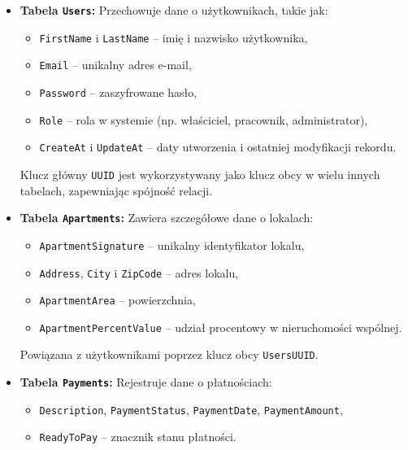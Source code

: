 \begin{itemize}
    \item \textbf{Tabela \texttt{Users}:}
    Przechowuje dane o użytkownikach, takie jak:
    \begin{itemize}
        \item \texttt{FirstName} i \texttt{LastName} -- imię i nazwisko użytkownika,
        \item \texttt{Email} -- unikalny adres e-mail,
        \item \texttt{Password} -- zaszyfrowane hasło,
        \item \texttt{Role} -- rola w systemie (np. właściciel, pracownik, administrator),
        \item \texttt{CreateAt} i \texttt{UpdateAt} -- daty utworzenia i ostatniej modyfikacji rekordu.
    \end{itemize}
    Klucz główny \texttt{UUID} jest wykorzystywany jako klucz obcy w wielu innych tabelach, zapewniając spójność relacji.

    \item \textbf{Tabela \texttt{Apartments}:}
    Zawiera szczegółowe dane o lokalach:
    \begin{itemize}
        \item \texttt{ApartmentSignature} -- unikalny identyfikator lokalu,
        \item \texttt{Address}, \texttt{City} i \texttt{ZipCode} -- adres lokalu,
        \item \texttt{ApartmentArea} -- powierzchnia,
        \item \texttt{ApartmentPercentValue} -- udział procentowy w nieruchomości wspólnej.
    \end{itemize}
    Powiązana z użytkownikami poprzez klucz obcy \texttt{UsersUUID}.
    
    \item \textbf{Tabela \texttt{Payments}:}
    Rejestruje dane o płatnościach:
    \begin{itemize}
        \item \texttt{Description}, \texttt{PaymentStatus}, \texttt{PaymentDate}, \texttt{PaymentAmount},
        \item \texttt{ReadyToPay} -- znacznik stanu płatności.
    \end{itemize}


\end{itemize}
